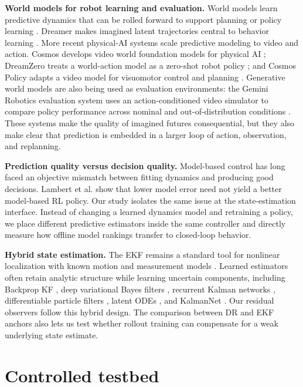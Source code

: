 \documentclass{article}
\begin{document}
\textbf{World models for robot learning and evaluation.} World models learn predictive dynamics that can be rolled forward to support planning or policy learning \citep{ha2018worldmodels}. Dreamer makes imagined latent trajectories central to behavior learning \citep{hafner2019dreamer,hafner2023dreamerv3}. More recent physical-AI systems scale predictive modeling to video and action. Cosmos develops video world foundation models for physical AI \citep{agarwal2025cosmos}; DreamZero treats a world-action model as a zero-shot robot policy \citep{ye2026dreamzero}; and Cosmos Policy adapts a video model for visuomotor control and planning \citep{kim2026cosmospolicy}. Generative world models are also being used as evaluation environments: the Gemini Robotics evaluation system uses an action-conditioned video simulator to compare policy performance across nominal and out-of-distribution conditions \citep{gemini2025veo}. These systems make the quality of imagined futures consequential, but they also make clear that prediction is embedded in a larger loop of action, observation, and replanning.

\textbf{Prediction quality versus decision quality.} Model-based control has long faced an objective mismatch between fitting dynamics and producing good decisions. Lambert et al. \citep{lambert2020objective} show that lower model error need not yield a better model-based RL policy. Our study isolates the same issue at the state-estimation interface. Instead of changing a learned dynamics model and retraining a policy, we place different predictive estimators inside the same controller and directly measure how offline model rankings transfer to closed-loop behavior.

\textbf{Hybrid state estimation.} The EKF remains a standard tool for nonlinear localization with known motion and measurement models \citep{thrun2005probabilistic}. Learned estimators often retain analytic structure while learning uncertain components, including Backprop KF \citep{ha2016backprop}, deep variational Bayes filters \citep{karl2017dvbf}, recurrent Kalman networks \citep{becker2019rkn}, differentiable particle filters \citep{jonschkowski2018dpf}, latent ODEs \citep{rubanova2019latentode}, and KalmanNet \citep{revach2022kalmannet}. Our residual observers follow this hybrid design. The comparison between DR and EKF anchors also lets us test whether rollout training can compensate for a weak underlying state estimate.

\section{Controlled testbed}
\label{sec:system}
\end{document}
